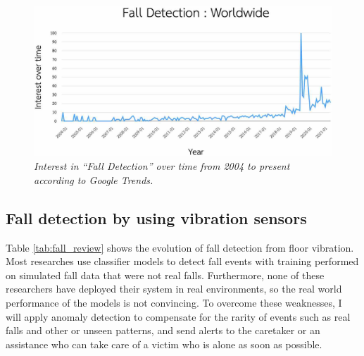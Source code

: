 \begin{figure}[H]
  \centering
  \caption[Interest in “Fall Detection” over time from 2004 to present according to Google Trends.]{\emph{Interest in “Fall Detection” over time from 2004 to present according to Google Trends.}}\label{fig:fall_trend}
  \includegraphics[width=\textwidth]{figures/fall_trend.jpg}
\end{figure}

\subsection{Fall detection by using vibration sensors}

Table \ref{tab:fall_review} shows the evolution of fall detection from floor vibration. Most researches use classifier models to detect fall events with training performed on simulated fall data that were not real falls. Furthermore, none of these researchers have deployed their system in real environments, so the real world performance of the models is not convincing. To overcome these weaknesses, I will apply anomaly detection to compensate for the rarity of events such as real falls and other or unseen patterns, and send alerts to the caretaker or an assistance who can take care of a victim who is alone as soon as possible.

